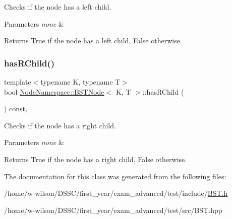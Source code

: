 Checks if the node has a left child. 


\begin{DoxyParams}{Parameters}
{\em none} & \\
\hline
\end{DoxyParams}
\begin{DoxyReturn}{Returns}
True if the node has a left child, False otherwise. 
\end{DoxyReturn}
\mbox{\label{class_node_namespace_1_1_b_s_t_node_a8850198713eafcc7033271ecb023b3bf}} 
\subsubsection{\texorpdfstring{has\+R\+Child()}{hasRChild()}}
{\footnotesize\ttfamily template$<$typename K, typename T$>$ \\
bool \hyperlink{class_node_namespace_1_1_b_s_t_node}{Node\+Namespace\+::\+B\+S\+T\+Node}$<$ K, T $>$\+::has\+R\+Child (\begin{DoxyParamCaption}{ }\end{DoxyParamCaption}) const\hspace{0.3cm}{\ttfamily [inline]}, {\ttfamily [noexcept]}}



Checks if the node has a right child. 


\begin{DoxyParams}{Parameters}
{\em none} & \\
\hline
\end{DoxyParams}
\begin{DoxyReturn}{Returns}
True if the node has a right child, False otherwise. 
\end{DoxyReturn}


The documentation for this class was generated from the following files\+:\begin{DoxyCompactItemize}
\item 
/home/w-\/wilson/\+D\+S\+S\+C/first\+\_\+year/exam\+\_\+advanced/test/include/\hyperlink{_b_s_t_8h}{B\+S\+T.\+h}\item 
/home/w-\/wilson/\+D\+S\+S\+C/first\+\_\+year/exam\+\_\+advanced/test/src/B\+S\+T.\+hpp\end{DoxyCompactItemize}
